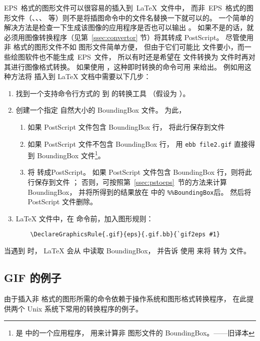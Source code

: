 EPS~格式的图形文件可以很容易的插入到~\LaTeX{}~文件中，
而非~EPS~格式的图形文件（、、、 等）则不是将插图命令中的文件名替换一下就可以的。
一个简单的解决方法是检查一下生成该图像的应用程序是否也可以输出 。
如果不是的话，就必须用图像转换程序（见第~\ref{ssec:convertor} 节）将其转成 PostScript。
尽管使用非  格式的图形文件不如  图形文件简单方便，
但由于它们可能比  文件要小，而一些绘图软件也不能生成~EPS~文件，
所以有时还是希望在  文件转换为  文件时再对其进行图像格式转换。
如果使用 ，这种即时转换的命令可用 来给出。
例如用这种方法将  插入到 \LaTeX{} 文档中需要以下几步：
\begin{enumerate}
	\item 找到一个支持命令行方式的  到  的转换工具
	（假设为 ）。
	\item 创建一个指定  自然大小的 BoundingBox 文件。
	为此，
	\begin{enumerate}
		\item 如果 PostScript 文件包含 BoundingBox 行，
		将此行保存到文件 
		\item 如果 PostScript 文件不包含 BoundingBox 行，
		用 \verb|ebb file2.gif| 直接得到 BoundingBox 文件\footnote{
			 是  中的一个应用程序，
			用来计算非 图形文件的 BoundingBox。——旧译本}。
		\item 将  转成PostScript。
		如果 PostScript 文件包含 BoundingBox 行，则将此行保存到文件 ；
		否则，可按照第~\ref{ssec:pstoeps}~节的方法来计算 BoundingBox，
		并将所得到的结果放在  中的 \verb|%%BoundingBox|后。
		然后将 PostScript 文件删除。
	\end{enumerate}
	\item \LaTeX{} 文件中，在  命令前，加入图形规则：
	\begin{lstlisting}
	\DeclareGraphicsRule{.gif}{eps}{.gif.bb}{`gif2eps #1}
	\end{lstlisting}
\end{enumerate}
当遇到  时，
\LaTeX{} 会从  中读取 BoundingBox，
并告诉  使用  来将  转为  文件。


\subsection{GIF 的例子}\label{ssec:gifexample}
由于插入非  格式的图形所需的命令依赖于操作系统和图形格式转换程序，
在此提供两个 Unix 系统下常用的转换程序的例子。

